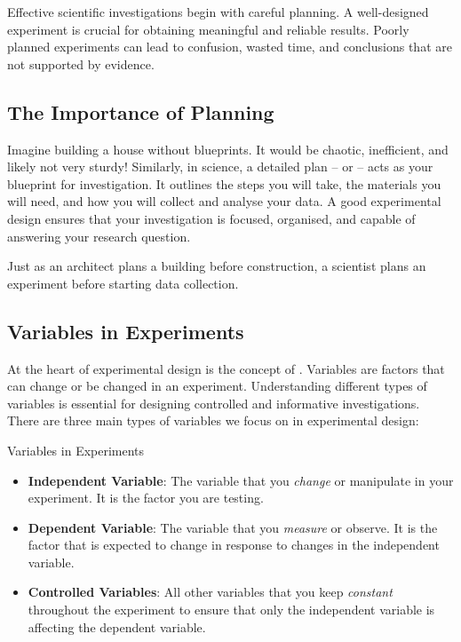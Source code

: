 Effective scientific investigations begin with careful planning.  A well-designed experiment is crucial for obtaining meaningful and reliable results.  Poorly planned experiments can lead to confusion, wasted time, and conclusions that are not supported by evidence.

\subsection{The Importance of Planning}

Imagine building a house without blueprints. It would be chaotic, inefficient, and likely not very sturdy!  Similarly, in science, a detailed plan – or  – acts as your blueprint for investigation.  It outlines the steps you will take, the materials you will need, and how you will collect and analyse your data. A good experimental design ensures that your investigation is focused, organised, and capable of answering your research question.

 Just as an architect plans a building before construction, a scientist plans an experiment before starting data collection.

\subsection{Variables in Experiments}

At the heart of experimental design is the concept of . Variables are factors that can change or be changed in an experiment. Understanding different types of variables is essential for designing controlled and informative investigations.  There are three main types of variables we focus on in experimental design:

\begin{keyconcept}{Variables in Experiments}
\begin{itemize}
    \item \textbf{Independent Variable}: The variable that you \textit{change} or manipulate in your experiment. It is the factor you are testing.
    \item \textbf{Dependent Variable}: The variable that you \textit{measure} or observe. It is the factor that is expected to change in response to changes in the independent variable.
    \item \textbf{Controlled Variables}:  All other variables that you keep \textit{constant} throughout the experiment to ensure that only the independent variable is affecting the dependent variable.
\end{itemize}
\end{keyconcept}

